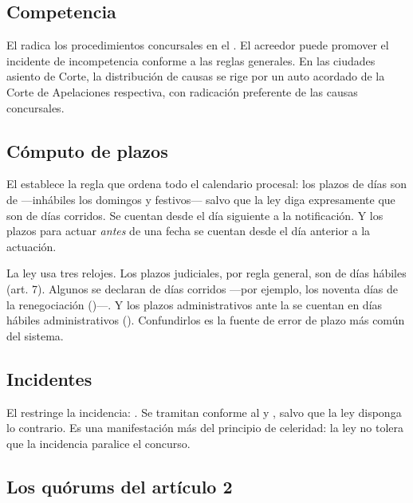 \subsection{Competencia}

El  radica los procedimientos concursales en el . El acreedor puede promover el incidente de incompetencia conforme a las reglas
generales. En las ciudades asiento de Corte, la distribución de causas se rige por un auto
acordado de la Corte de Apelaciones respectiva, con radicación preferente de las causas
concursales.

\subsection{Cómputo de plazos}

El  establece la regla que ordena todo el calendario procesal: los plazos de días son de
 ---inhábiles los domingos y festivos--- salvo que la ley diga
expresamente que son de días corridos. Se cuentan desde el día siguiente a la notificación. Y
los plazos para actuar \emph{antes} de una fecha se cuentan  desde el día
anterior a la actuación.

\begin{alerta}
La ley usa tres relojes. Los plazos judiciales, por regla general, son de días hábiles
(art. 7). Algunos se declaran de días corridos ---por ejemplo, los noventa días de la
renegociación ()---. Y los plazos administrativos ante la \superir{} se cuentan en días
hábiles administrativos (). Confundirlos es la fuente de error de plazo más común del
sistema.
\end{alerta}

\subsection{Incidentes}

El  restringe la incidencia: . Se tramitan conforme al \cpc{} y , salvo que la ley disponga lo contrario. Es una manifestación más del principio
de celeridad: la ley no tolera que la incidencia paralice el concurso.

\subsection{Los quórums del artículo 2}

